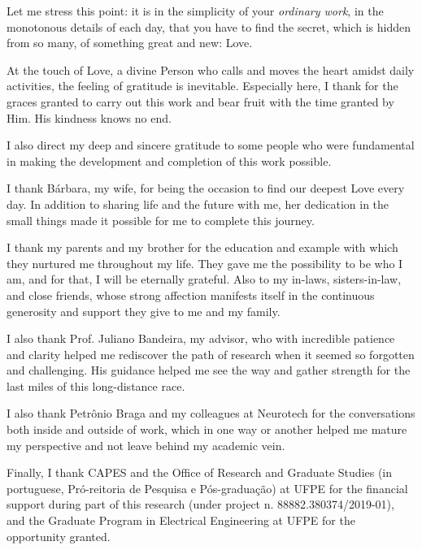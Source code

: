 %

\begin{openingquote}
    Let me stress this point: it is in the simplicity of your \emph{ordinary work}, in the monotonous details of each day, that you have to find the secret, which is hidden from so many, of something great and new: Love. \cite[n. 489]{escriva2016sulco}
\end{openingquote}

At the touch of Love, a divine Person who calls and moves the heart amidst daily activities, the feeling of gratitude is inevitable. Especially here, I thank for the graces granted to carry out this work and bear fruit with the time granted by Him. His kindness knows no end.

I also direct my deep and sincere gratitude to some people who were fundamental in making the development and completion of this work possible.

I thank B\'arbara, my wife, for being the occasion to find our deepest Love every day. In addition to sharing life and the future with me, her dedication in the small things made it possible for me to complete this journey.

I thank my parents and my brother for the education and example with which they nurtured me throughout my life. They gave me the possibility to be who I am, and for that, I will be eternally grateful. Also to my in-laws, sisters-in-law, and close friends, whose strong affection manifests itself in the continuous generosity and support they give to me and my family.

I also thank Prof. Juliano Bandeira, my advisor, who with incredible patience and clarity helped me rediscover the path of research when it seemed so forgotten and challenging. His guidance helped me see the way and gather strength for the last miles of this long-distance race.

I also thank Petrônio Braga and my colleagues at Neurotech for the conversations both inside and outside of work, which in one way or another helped me mature my perspective and not leave behind my academic vein.

Finally, I thank CAPES and the Office of Research and Graduate Studies (in portuguese, Pr\'o-reitoria de Pesquisa e P\'os-gradua\c c\~ao) at UFPE for the financial support during part of this research (under project n. 88882.380374/2019-01), and the Graduate Program in Electrical Engineering at UFPE for the opportunity granted.
